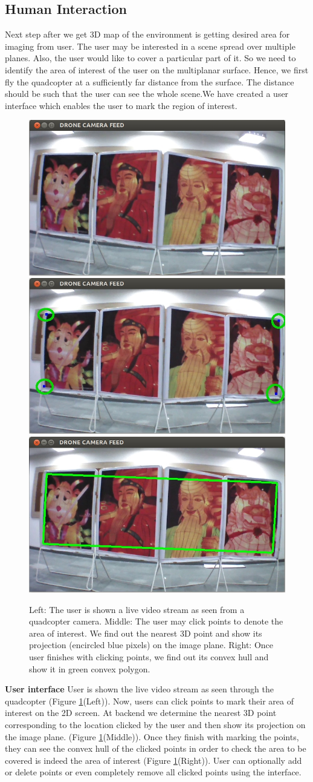 \subsection{Human Interaction}
Next step after we get 3D map of the environment is getting desired area for
imaging from user. The user may be interested in a scene spread over multiple
planes. Also, the user would like to cover a particular part of it. So we need
to identify the area of interest of the user on the multiplanar surface.
Hence, we  first fly the quadcopter at a sufficiently far distance from the
surface. The distance should be such that the user can see the whole
scene.We have created a user interface which enables the user to mark the region
of interest.\\
\begin{figure}[t!]
\centering
\includegraphics[width=0.31\linewidth]{images/UI_input}
\includegraphics[width=0.31\linewidth]{images/UI_points_marked}
\includegraphics[width=0.31\linewidth]{images/UI_convexHull}
\caption[Our user interface]{Left: The user is shown a live video stream as seen
from a quadcopter camera. Middle: The user may click points to denote the area of interest. We 
find out the nearest 3D point and show its projection (encircled blue pixels) on
the image plane. Right: Once user finishes with clicking points, we find out its convex
hull and show it in green convex polygon.}
\label{fig:ui}
\end{figure}
\textbf{User interface} User is shown the live video stream as seen through
the quadcopter (Figure \ref{fig:ui}(Left)). Now, users can click points to
mark their area of interest on the 2D screen. At backend we determine the
nearest 3D point corresponding to the location clicked by the user and then show
its projection on the image plane. (Figure \ref{fig:ui}(Middle)). Once they
finish with marking the points, they can see the convex hull of the
clicked points in order to check the area to be covered is indeed the area of
interest (Figure \ref{fig:ui}(Right)). User can optionally add or delete points
or even completely remove all clicked points using the interface.

